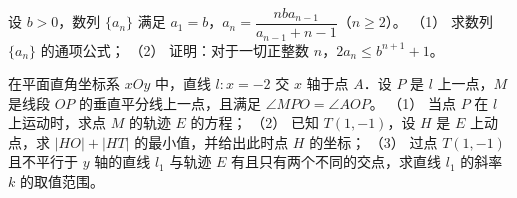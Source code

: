 \begin{question}
设 $b>0$，数列 $\{a_n\}$ 满足 $a_1=b$，$a_n=\dfrac{nba_{n-1}}{a_{n-1}+n-1}$（$n\geqslant2$）。
（1） 求数列 $\{a_n\}$ 的通项公式；
（2） 证明：对于一切正整数 $n$，$2a_n\leqslant b^{n+1}+1$。
\end{question}
\begin{question}
在平面直角坐标系 $xOy$ 中，直线 $l:x=-2$ 交 $x$ 轴于点 $A$．设 $P$ 是 $l$ 上一点，$M$ 是线段 $OP$ 的垂直平分线上一点，且满足 $\angle MPO=\angle AOP$。
（1） 当点 $P$ 在 $l$ 上运动时，求点 $M$ 的轨迹 $E$ 的方程；
（2） 已知 $T(1,-1)$，设 $H$ 是 $E$ 上动点，求 $|HO|+|HT|$ 的最小值，并给出此时点 $H$ 的坐标；
（3） 过点 $T(1,-1)$ 且不平行于 $y$ 轴的直线 $l_1$ 与轨迹 $E$ 有且只有两个不同的交点，求直线 $l_1$ 的斜率 $k$ 的取值范围。

\end{question}